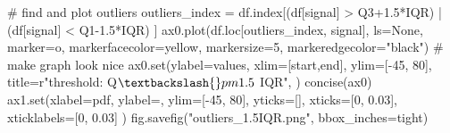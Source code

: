 \documentclass[
  letterpaper,
  DIV=11,
  numbers=noendperiod,
  oneside]{scrreprt}
\newenvironment{Shaded}{\begin{snugshade}}{\end{snugshade}}
\newcommand{\BuiltInTok}[1]{\textcolor[rgb]{0.00,0.23,0.31}{#1}}
\newcommand{\CommentTok}[1]{\textcolor[rgb]{0.37,0.37,0.37}{#1}}
\newcommand{\DecValTok}[1]{\textcolor[rgb]{0.68,0.00,0.00}{#1}}
\newcommand{\FloatTok}[1]{\textcolor[rgb]{0.68,0.00,0.00}{#1}}
\newcommand{\NormalTok}[1]{\textcolor[rgb]{0.00,0.23,0.31}{#1}}
\newcommand{\OperatorTok}[1]{\textcolor[rgb]{0.37,0.37,0.37}{#1}}
\newcommand{\StringTok}[1]{\textcolor[rgb]{0.13,0.47,0.30}{#1}}
\newcommand{\VerbatimStringTok}[1]{\textcolor[rgb]{0.13,0.47,0.30}{#1}}
\begin{document}
\begin{Shaded}
\begin{Highlighting}[]
\CommentTok{\# find and plot outliers}
\NormalTok{outliers\_index }\OperatorTok{=}\NormalTok{ df.index[(df[}\StringTok{\textquotesingle{}signal\textquotesingle{}}\NormalTok{] }\OperatorTok{\textgreater{}}\NormalTok{ Q3}\OperatorTok{+}\FloatTok{1.5}\OperatorTok{*}\NormalTok{IQR) }\OperatorTok{|} 
\NormalTok{                          (df[}\StringTok{\textquotesingle{}signal\textquotesingle{}}\NormalTok{] }\OperatorTok{\textless{}}\NormalTok{ Q1}\OperatorTok{{-}}\FloatTok{1.5}\OperatorTok{*}\NormalTok{IQR)}
\NormalTok{                         ]}
\NormalTok{ax0.plot(df.loc[outliers\_index, }\StringTok{\textquotesingle{}signal\textquotesingle{}}\NormalTok{], ls}\OperatorTok{=}\StringTok{\textquotesingle{}None\textquotesingle{}}\NormalTok{,}
\NormalTok{        marker}\OperatorTok{=}\StringTok{\textquotesingle{}o\textquotesingle{}}\NormalTok{, markerfacecolor}\OperatorTok{=}\StringTok{\textquotesingle{}yellow\textquotesingle{}}\NormalTok{, markersize}\OperatorTok{=}\DecValTok{5}\NormalTok{,}
\NormalTok{        markeredgecolor}\OperatorTok{=}\StringTok{"black"}\NormalTok{)}
\CommentTok{\# make graph look nice}
\NormalTok{ax0.}\BuiltInTok{set}\NormalTok{(ylabel}\OperatorTok{=}\StringTok{\textquotesingle{}values\textquotesingle{}}\NormalTok{,}
\NormalTok{       xlim}\OperatorTok{=}\NormalTok{[start,end],}
\NormalTok{       ylim}\OperatorTok{=}\NormalTok{[}\OperatorTok{{-}}\DecValTok{45}\NormalTok{, }\DecValTok{80}\NormalTok{],}
\NormalTok{       title}\OperatorTok{=}\VerbatimStringTok{r"threshold: Q$\textbackslash{}pm1.5$ IQR"}\NormalTok{,}
\NormalTok{       )}
\NormalTok{concise(ax0)}
\NormalTok{ax1.}\BuiltInTok{set}\NormalTok{(xlabel}\OperatorTok{=}\StringTok{\textquotesingle{}pdf\textquotesingle{}}\NormalTok{,}
\NormalTok{        ylabel}\OperatorTok{=}\StringTok{\textquotesingle{}\textquotesingle{}}\NormalTok{,}
\NormalTok{        ylim}\OperatorTok{=}\NormalTok{[}\OperatorTok{{-}}\DecValTok{45}\NormalTok{, }\DecValTok{80}\NormalTok{],}
\NormalTok{        yticks}\OperatorTok{=}\NormalTok{[],}
\NormalTok{        xticks}\OperatorTok{=}\NormalTok{[}\DecValTok{0}\NormalTok{, }\FloatTok{0.03}\NormalTok{],}
\NormalTok{        xticklabels}\OperatorTok{=}\NormalTok{[}\StringTok{\textquotesingle{}0\textquotesingle{}}\NormalTok{, }\StringTok{\textquotesingle{}0.03\textquotesingle{}}\NormalTok{]}
\NormalTok{        )}
\NormalTok{fig.savefig(}\StringTok{"outliers\_1.5IQR.png"}\NormalTok{, bbox\_inches}\OperatorTok{=}\StringTok{\textquotesingle{}tight\textquotesingle{}}\NormalTok{)}
\end{Highlighting}
\end{Shaded}
\end{document}
